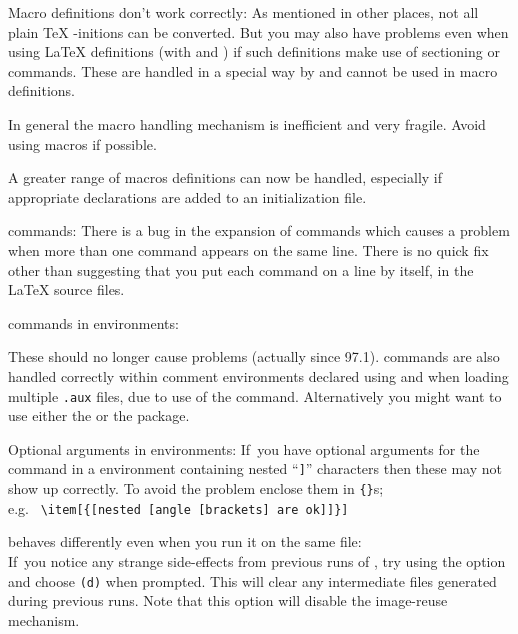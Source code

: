 \begin{htmllist}
\item [Macro definitions don't work correctly: ]
As mentioned in other places, not all plain \TeX{} -initions
can be converted.
But you may also have problems even when using \LaTeX{} definitions
(with  and ) if such definitions
make use of sectioning or  commands. These are
handled in a special way by \latextohtml{} and cannot be used in
macro definitions.

In general the macro handling mechanism is inefficient and very
fragile. Avoid using macros if possible.
\begin{changebar}%
A greater range of macros definitions can now be handled,
especially if appropriate declarations are added to an initialization file.
\end{changebar}%


\item [\Lc{input} commands: ]
There is a bug in the expansion of  commands which causes
a problem
when more than one  command appears on the same line.
There is no quick fix other than suggesting that you put each
 command on a line by itself,
in the \LaTeX{} source files.

\item [\Lc{input} commands in \env{verbatim} environments: ]
\begin{changebar}
These should no longer cause problems (actually since 97.1).
 commands are also handled correctly within comment environments
declared using 
and when loading multiple \texttt{.aux} files,
due to use of the  command.
Alternatively you might want to use
either the  or the  package.
\end{changebar}

\item [Optional arguments in \env{description} environments: ]
If~you have optional arguments for the  command in
a  environment containing nested ``\texttt{]}'' characters then
these may not show up correctly. To avoid the problem enclose them
in \verb|{}|s;\\ e.g. \ \verb+\item[{[nested [angle [brackets] are ok]]}]+


\item [\latextohtml{} behaves differently even when you run it on the
same file: ]~\\
If~you notice any strange side-effects from previous runs of \latextohtml{},
try using the option  and choose \texttt{(d)} when prompted.
This will clear any intermediate files generated during previous runs.
Note that this option will disable the image-reuse mechanism.


\end{htmllist}
